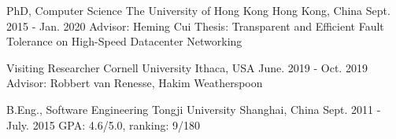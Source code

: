 

\begin{cventries}


\cventry
{PhD, Computer Science} %
{The University of Hong Kong} %
{Hong Kong, China} %
{Sept. 2015 - Jan. 2020} %
{ %
Advisor: Heming Cui\newline
Thesis: Transparent and Efficient Fault Tolerance on High-Speed Datacenter Networking
}


\cventry
{Visiting Researcher} %
{Cornell University} %
{Ithaca, USA} %
{June. 2019 - Oct. 2019} %
{ %
Advisor: Robbert van Renesse, Hakim Weatherspoon
}


\cventry
{B.Eng., Software Engineering} %
{Tongji University} %
{Shanghai, China} %
{Sept. 2011 - July. 2015} %
{ %
GPA: 4.6/5.0, ranking: 9/180
}

\end{cventries}